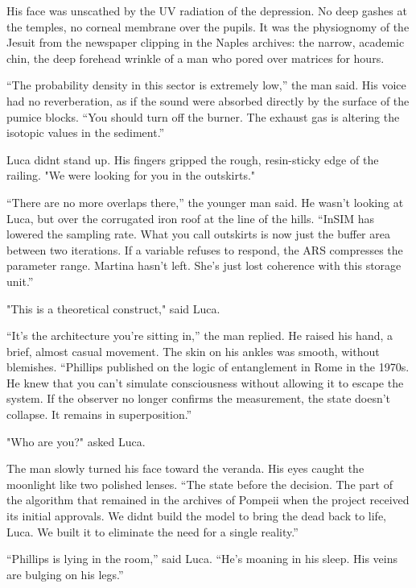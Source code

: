 \documentclass[
  ngerman,
]{article}
\begin{document}
His face was unscathed by the UV radiation of the depression. No deep
gashes at the temples, no corneal membrane over the pupils. It was the
physiognomy of the Jesuit from the newspaper clipping in the Naples
archives: the narrow, academic chin, the deep forehead wrinkle of a man
who pored over matrices for hours.

``The probability density in this sector is extremely low,'' the man
said. His voice had no reverberation, as if the sound were absorbed
directly by the surface of the pumice blocks. ``You should turn off the
burner. The exhaust gas is altering the isotopic values
\hspace{0pt}\hspace{0pt}in the sediment.''

Luca didn\textquotesingle t stand up. His fingers gripped the rough,
resin-sticky edge of the railing. "We were looking for you in the
outskirts."

``There are no more overlaps there,'' the younger man said. He wasn't
looking at Luca, but over the corrugated iron roof at the line of the
hills. ``InSIM has lowered the sampling rate. What you call outskirts is
now just the buffer area between two iterations. If a variable refuses
to respond, the ARS compresses the parameter range. Martina hasn't left.
She's just lost coherence with this storage unit.''

"This is a theoretical construct," said Luca.

``It's the architecture you're sitting in,'' the man replied. He raised
his hand, a brief, almost casual movement. The skin on his ankles was
smooth, without blemishes. ``Phillips published on the logic of
entanglement in Rome in the 1970s. He knew that you can't simulate
consciousness without allowing it to escape the system. If the observer
no longer confirms the measurement, the state doesn't collapse. It
remains in superposition.''

"Who are you?" asked Luca.

The man slowly turned his face toward the veranda. His eyes caught the
moonlight like two polished lenses. ``The state before the decision. The
part of the algorithm that remained in the archives of Pompeii when the
project received its initial approvals. We didn\textquotesingle t build
the model to bring the dead back to life, Luca. We built it to eliminate
the need for a single reality.''

``Phillips is lying in the room,'' said Luca. ``He's moaning in his
sleep. His veins are bulging on his legs.''
\end{document}
